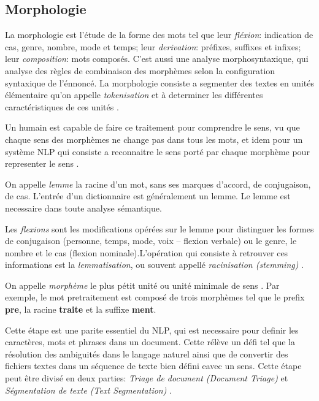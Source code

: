 \subsection{Morphologie}
La morphologie est l'étude de la forme des mots tel que leur \textit{fléxion}: indication de cas, genre, nombre, mode et temps; leur \textit{derivation}: préfixes, suffixes et infixes; leur \textit{composition}: mots composés. C'est aussi une analyse morphosyntaxique, qui analyse des règles de combinaison des morphèmes selon la configuration syntaxique de l'énnoncé. La morphologie consiste a segmenter des textes en unités élémentaire qu'on appelle \textit{tokenisation} et à determiner les différentes caractéristiques de ces unités \citep{automatic-nlp,natural-language-processing}.

Un humain est capable de faire ce traitement pour comprendre le sens, vu que chaque sens des morphèmes ne change pas dans tous les mots, et idem pour un système NLP qui consiste a reconnaitre le sens porté par chaque morphème pour representer le sens \citep{natural-language-processing}.

\begin{definition}[Lemme]
    On appelle \textit{lemme} la racine d’un mot, sans ses marques d’accord, de conjugaison, de cas. L'entrée d'un dictionnaire est généralement un lemme. Le lemme est necessaire dans toute analyse sémantique. \citep{automatic-nlp}
\end{definition}

\begin{definition}[Flexion]
    Les \textit{flexions} sont les modifications opérées sur le lemme pour distinguer les formes de conjugaison (personne, temps, mode, voix – flexion verbale) ou le genre, le nombre et le cas (flexion nominale).L’opération qui consiste à retrouver ces informations est la \textit{lemmatisation}, ou souvent appellé \textit{racinisation (stemming)} \citep{automatic-nlp}.
\end{definition}

\begin{definition}[Morphème]
    On appelle \textit{morphème} le plus pétit unité ou unité minimale de sens \citep{natural-language-processing}. Par exemple, le mot pretraitement est composé de trois morphèmes tel que le prefix \textbf{pre}, la racine \textbf{traite} et la suffixe \textbf{ment}.
\end{definition}

Cette étape est une parite essentiel du NLP, qui est necessaire pour definir les caractères, mots et phrases dans un document. Cette rélève un défi tel que la résolution des ambiguités dans le langage naturel ainsi que de convertir des fichiers textes dans un séquence de texte bien défini eavec un sens. Cette étape peut être divisé en deux parties: \textit{Triage de document (Document Triage)} et \textit{Ségmentation de texte (Text Segmentation)} \citep{handbook-nlp}.

